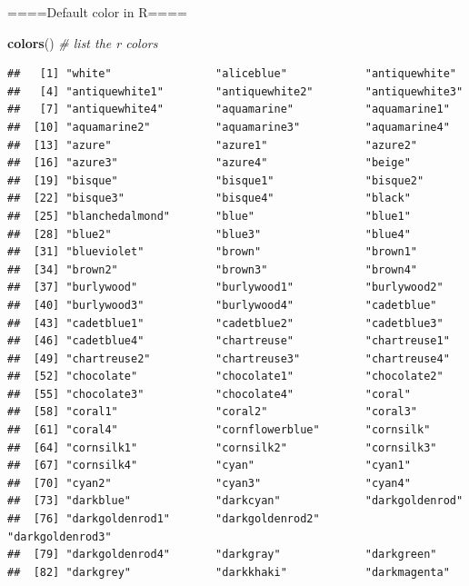 \documentclass[]{book}
\newenvironment{Shaded}{\begin{snugshade}}{\end{snugshade}}
\newcommand{\KeywordTok}[1]{\textcolor[rgb]{0.13,0.29,0.53}{\textbf{#1}}}
\newcommand{\CommentTok}[1]{\textcolor[rgb]{0.56,0.35,0.01}{\textit{#1}}}
\newcommand{\NormalTok}[1]{#1}
\begin{document}
====Default color in R====

\begin{Shaded}
\begin{Highlighting}[]
\KeywordTok{colors}\NormalTok{() }\CommentTok{# list the r colors}
\end{Highlighting}
\end{Shaded}

\begin{verbatim}
##   [1] "white"                "aliceblue"            "antiquewhite"        
##   [4] "antiquewhite1"        "antiquewhite2"        "antiquewhite3"       
##   [7] "antiquewhite4"        "aquamarine"           "aquamarine1"         
##  [10] "aquamarine2"          "aquamarine3"          "aquamarine4"         
##  [13] "azure"                "azure1"               "azure2"              
##  [16] "azure3"               "azure4"               "beige"               
##  [19] "bisque"               "bisque1"              "bisque2"             
##  [22] "bisque3"              "bisque4"              "black"               
##  [25] "blanchedalmond"       "blue"                 "blue1"               
##  [28] "blue2"                "blue3"                "blue4"               
##  [31] "blueviolet"           "brown"                "brown1"              
##  [34] "brown2"               "brown3"               "brown4"              
##  [37] "burlywood"            "burlywood1"           "burlywood2"          
##  [40] "burlywood3"           "burlywood4"           "cadetblue"           
##  [43] "cadetblue1"           "cadetblue2"           "cadetblue3"          
##  [46] "cadetblue4"           "chartreuse"           "chartreuse1"         
##  [49] "chartreuse2"          "chartreuse3"          "chartreuse4"         
##  [52] "chocolate"            "chocolate1"           "chocolate2"          
##  [55] "chocolate3"           "chocolate4"           "coral"               
##  [58] "coral1"               "coral2"               "coral3"              
##  [61] "coral4"               "cornflowerblue"       "cornsilk"            
##  [64] "cornsilk1"            "cornsilk2"            "cornsilk3"           
##  [67] "cornsilk4"            "cyan"                 "cyan1"               
##  [70] "cyan2"                "cyan3"                "cyan4"               
##  [73] "darkblue"             "darkcyan"             "darkgoldenrod"       
##  [76] "darkgoldenrod1"       "darkgoldenrod2"       "darkgoldenrod3"      
##  [79] "darkgoldenrod4"       "darkgray"             "darkgreen"           
##  [82] "darkgrey"             "darkkhaki"            "darkmagenta"         

\end{verbatim}
\end{document}
